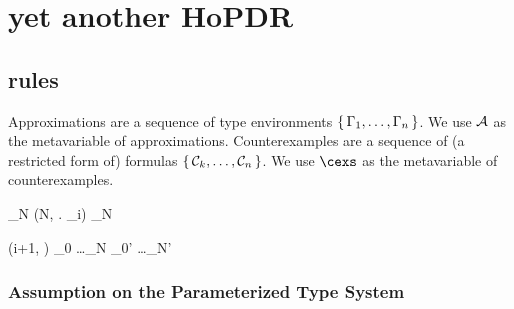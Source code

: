 \documentclass[acmsmall,review,anonymous]{acmart}\settopmatter{printfolios=true,printccs=false,printacmref=false}
\begin{document}
\section{yet another HoPDR}

\subsection{rules}

Approximations are a sequence of type environments \( \{\, \Gamma_1, \dots, \Gamma_n \, \} \). We use \( \mathcal{A} \) as the metavariable of approximations.
Counterexamples are a sequence of (a restricted form of) formulas \( \{\, \mathcal{C}_k, \dots, \mathcal{C}_n \, \} \). We use \( \cexs \) as the metavariable of counterexamples.

\infrule[Initialize]{
}{
\Tr \epsilon \pdrmid \TE{\stE}
}



 {
\epsilon \pdrmid \aprx \cdot \tenv_N
\Tr (N, \forall {}.\: \formula_i) \pdrmid \aprx \cdot \tenv_N
}

 {
(i+1, \cex) \cdot \cexs \pdrmid \tenv_0 \dots \tenv_N
\Tr \cexs \pdrmid \tenv_0' \dots \tenv_N'
}


\subsubsection{Assumption on the Parameterized Type System}
\end{document}
